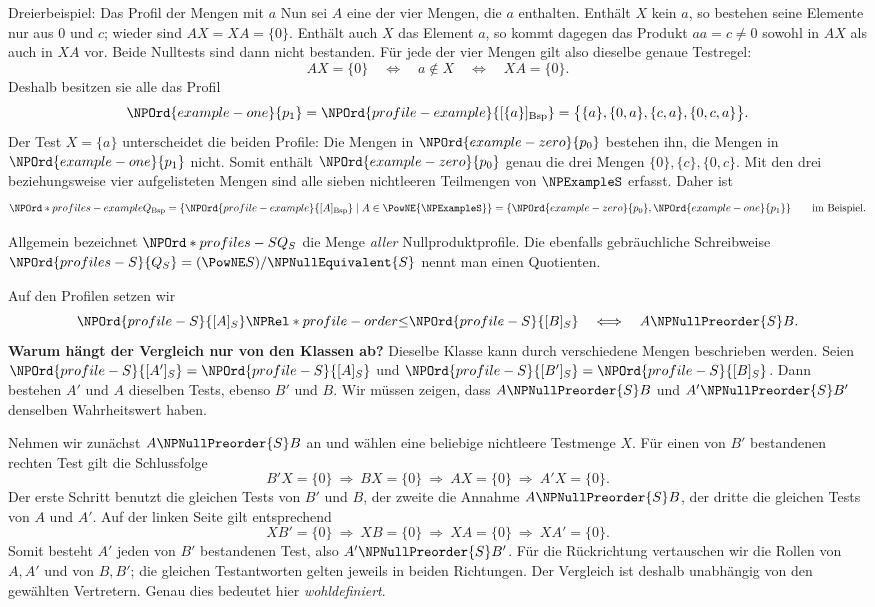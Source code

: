 \begin{NPReadingExample}{Dreierbeispiel: Das Profil der Mengen mit \(a\)}
Nun sei \(A\) eine der vier Mengen, die \(a\) enthalten.
Enthält \(X\) kein \(a\), so bestehen seine Elemente nur aus
\(0\) und \(c\); wieder sind \(AX=XA=\{0\}\).
Enthält auch \(X\) das Element \(a\), so kommt dagegen das
Produkt \(aa=c\ne0\) sowohl in \(AX\) als auch in \(XA\) vor.
Beide Nulltests sind dann nicht bestanden. Für jede der vier Mengen
gilt also dieselbe genaue Testregel:
\[
 AX=\{0\}\quad\Longleftrightarrow\quad a\notin X
 \quad\Longleftrightarrow\quad XA=\{0\}.
\]
Deshalb besitzen sie alle das Profil
\[
 \NPOrd{example-one}{p_1}=\NPOrd{profile-example}{[\{a\}]_{\mathrm{Bsp}}}
     =\bigl\{\{a\},\{0,a\},\{c,a\},\{0,c,a\}\bigr\}.
\]
Der Test \(X=\{a\}\) unterscheidet die beiden Profile: Die Mengen
in \(\NPOrd{example-zero}{p_0}\) bestehen ihn, die Mengen in \(\NPOrd{example-one}{p_1}\) nicht.
Somit enthält \(\NPOrd{example-zero}{p_0}\) genau die drei Mengen
\(\{0\},\{c\},\{0,c\}\).
Mit den drei beziehungsweise vier aufgelisteten Mengen sind alle
sieben nichtleeren Teilmengen von \(\NPExampleS\) erfasst. Daher ist
\[
 \NPOrd*{profiles-example}{Q_{\mathrm{Bsp}}}=\{\NPOrd{profile-example}{[A]_{\mathrm{Bsp}}}\mid A\in\PowNE{\NPExampleS}\}=\{\NPOrd{example-zero}{p_0},\NPOrd{example-one}{p_1}\}
 \qquad\text{im Beispiel}.
\]
\end{NPReadingExample}
Allgemein bezeichnet \(\NPOrd*{profiles-S}{Q_S}\) die Menge \emph{aller} Nullproduktprofile.
Die ebenfalls gebräuchliche Schreibweise
\(\NPOrd{profiles-S}{Q_S}=(\PowNE S)/{\NPNullEquivalent{S}}\) nennt man einen Quotienten.

Auf den Profilen setzen wir
\[
 \NPOrd{profile-S}{[A]_S}\NPRel*{profile-order}{\le}\NPOrd{profile-S}{[B]_S}\quad\Longleftrightarrow\quad A\NPNullPreorder{S} B.
\]
\medskip\noindent\textbf{Warum hängt der Vergleich nur von den Klassen ab?}
Dieselbe Klasse kann durch verschiedene Mengen beschrieben werden.
Seien \(\NPOrd{profile-S}{[A']_S}=\NPOrd{profile-S}{[A]_S}\) und \(\NPOrd{profile-S}{[B']_S}=\NPOrd{profile-S}{[B]_S}\). Dann bestehen \(A'\)
und \(A\) dieselben Tests, ebenso \(B'\) und \(B\).
Wir müssen zeigen, dass \(A\NPNullPreorder{S} B\) und \(A'\NPNullPreorder{S} B'\)
denselben Wahrheitswert haben.

Nehmen wir zunächst \(A\NPNullPreorder{S} B\) an und wählen eine beliebige
nichtleere Testmenge \(X\). Für einen von \(B'\) bestandenen rechten
Test gilt die Schlussfolge
\[
 B'X=\{0\}\ \Longrightarrow\ BX=\{0\}
 \ \Longrightarrow\ AX=\{0\}\ \Longrightarrow\ A'X=\{0\}.
\]
Der erste Schritt benutzt die gleichen Tests von \(B'\) und \(B\),
der zweite die Annahme \(A\NPNullPreorder{S} B\), der dritte die gleichen
Tests von \(A\) und \(A'\). Auf der linken Seite gilt entsprechend
\[
 XB'=\{0\}\ \Longrightarrow\ XB=\{0\}
 \ \Longrightarrow\ XA=\{0\}\ \Longrightarrow\ XA'=\{0\}.
\]
Somit besteht \(A'\) jeden von \(B'\) bestandenen Test, also
\(A'\NPNullPreorder{S} B'\). Für die Rückrichtung vertauschen wir die Rollen
von \(A,A'\) und von \(B,B'\); die gleichen Testantworten gelten
jeweils in beiden Richtungen. Der Vergleich ist deshalb unabhängig
von den gewählten Vertretern. Genau dies bedeutet hier
\emph{wohldefiniert}.

